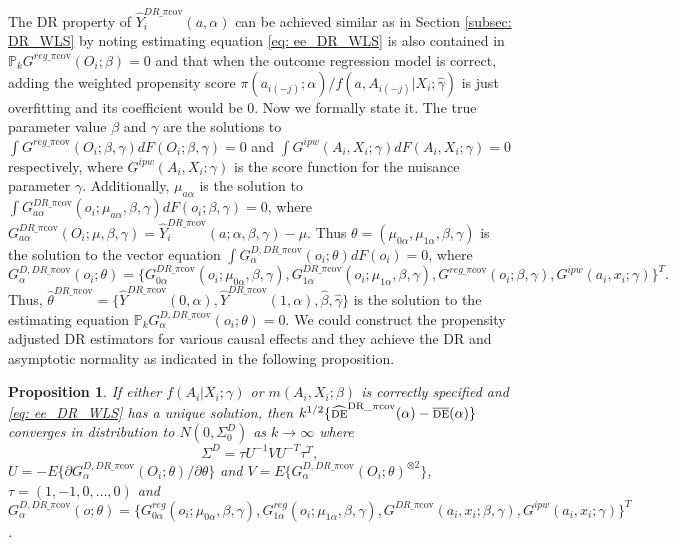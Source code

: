 \documentclass[oupdraft]{bio}
\newtheorem{proposition}{Proposition}
\begin{document}
The DR property of $\widehat{Y}_i^{DR\_\pi\text{cov}}(a,\alpha)$ can be achieved similar as in Section \ref{subsec: DR_WLS} by noting estimating equation \eqref{eq: ee_DR_WLS} is also contained in $\mathds{P}_kG^{reg\_\pi\text{cov}}(O_i;\beta)=0$ and that when the outcome regression model is correct, adding the weighted propensity score $\pi(a_{i(-j)};\alpha)/f(a, A_{i(-j)}|X_i;\hat\gamma)$ is just overfitting and its coefficient would be 0. Now we formally state it. The true parameter value $\beta$ and $\gamma$ are the solutions to $\int G^{reg\_\pi\text{cov}}(O_i;\beta,\gamma)dF(O_i;\beta,\gamma)=0$ and $\int G^{ipw}(A_i,X_i;\gamma)dF(A_i,X_i;\gamma)=0$ respectively, where  $G^{ipw}(A_i,X_i;\gamma)$ is the score function for the nuisance parameter $\gamma$. Additionally, $\mu_{a\alpha}$ is the solution to $\int G^{DR\_\pi\text{cov}}_{a\alpha}(o_i;\mu_{a\alpha},\beta,\gamma) dF(o_i;\beta,\gamma) = 0$, where $G^{DR\_\pi\text{cov}}_{a\alpha}(O_i;\mu,\beta,\gamma) =\widehat{Y}_i^{DR\_\pi\text{cov}}(a;\alpha,\beta,\gamma)- \mu$.  Thus $\theta=(\mu_{0\alpha},\mu_{1\alpha},\beta,\gamma)$ is the solution to the vector equation $\int G^{ D, DR\_\pi\text{cov}}_{\alpha}(o_i;\theta) dF(o_i) = 0$, where $$G^{ D,DR\_\pi\text{cov}}_{\alpha}(o_i;\theta) = \{G^{DR\_\pi\text{cov}}_{0\alpha}(o_i;\mu_{0\alpha},\beta,\gamma),G^{DR\_\pi\text{cov}}_{1\alpha}(o_i;\mu_{1\alpha},\beta,\gamma),G^{reg\_\pi\text{cov}}(o_i;\beta,\gamma),G^{ipw}(a_i,x_i;\gamma)\}^T.$$ Thus, $\hat \theta^{DR\_\pi\text{cov}}=\{\hat Y^{DR\_\pi\text{cov}}(0,\alpha),\hat Y^{DR\_\pi\text{cov}}(1,\alpha),\hat\beta,\hat\gamma\}$ is the solution to the estimating equation $\mathds{P}_k G^{D,DR\_\pi\text{cov}}_{\alpha}(o_i;\theta)=0$. We could construct the propensity adjusted DR estimators for various causal effects and they achieve the DR and asymptotic normality as indicated in the following proposition. 

\begin{proposition}\label{prop: DR_pi_cov}
If either $f(A_i|X_i;\gamma)$ or $m(A_i,X_i;\beta)$ is correctly specified and \eqref{eq: ee_DR_WLS} has a unique solution, then \emph{$k^{1/2}\{\widehat{\textsc{de}}^{\text{DR\_}\pi\text{cov}}(\alpha)-\overline{\textsc{de}}(\alpha)\}$} converges in distribution to $N(0,\Sigma_0^{D})$ as $k \to \infty$ where 
\[
\Sigma^{D} = \tau U^{-1} V U^{-T}\tau^T,
\]
$U=-E\{\partial G_{\alpha}^{D,DR\_\pi\text{cov}}(O_i;\theta)/\partial \theta\}$ and $V=E\{G_{\alpha}^{D,DR\_\pi\text{cov}}(O_i;\theta)^{\otimes 2}\}$, $\tau=(1,-1, 0,\ldots,0)$ and \\$G^{D,DR\_\pi\text{cov}}_{\alpha}(o;\theta)=\{G^{reg}_{0\alpha}(o_i;\mu_{0\alpha},\beta,\gamma),G^{reg}_{1\alpha}(o_i;\mu_{1\alpha},\beta,\gamma),G^{DR\_\pi\text{cov}}(a_i,x_i;\beta,\gamma),G^{ipw}(a_i,x_i;\gamma)\}^T$.
\end{proposition}
\end{document}
